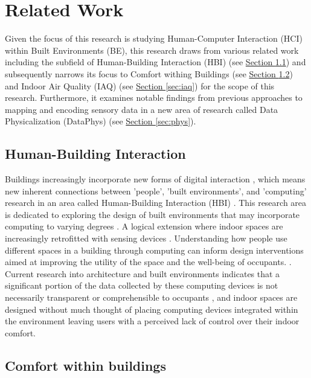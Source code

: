 \section{Related Work}
\label{sec:related_work}
Given the focus of this research is studying Human-Computer Interaction (HCI) within Built Environments (BE), this research draws from various related work including the subfield of Human-Building Interaction (HBI) (see \hyperref[sec:hbi]{Section \ref*{sec:hbi}}) and subsequently narrows its focus to Comfort withing Buildings (see \hyperref[sec:poe]{Section \ref*{sec:poe}}) and Indoor Air Quality (IAQ) (see \hyperref[sec:iaq]{Section \ref*{sec:iaq}}) for the scope of this research. Furthermore, it examines notable findings from previous approaches to mapping and encoding sensory data in a new area of research called Data Physicalization (DataPhys) (see \hyperref[sec:phys]{Section \ref*{sec:phys}}).

\subsection{Human-Building Interaction}
\label{sec:hbi}

Buildings increasingly incorporate new forms of digital interaction \cite{pulsipher_towards_2023, margariti_understanding_2023}, which means new inherent connections between 'people', 'built environments', and 'computing' research in an area called Human-Building Interaction (HBI) \cite{alavi_introduction_2019, taherkhani_human-building_2023}. This research area is dedicated to exploring the design of built environments that may incorporate computing to varying degrees \cite{sowles_introducing_2021}.  A logical extension where indoor spaces are increasingly retrofitted with sensing devices \cite{pulsipher_towards_2023}. Understanding how people use different spaces in a building through computing can inform design interventions aimed at improving the utility of the space and the well-being of occupants. \cite{verma_studying_2017}. Current research into architecture and built environments indicates that a significant portion of the data collected by these computing devices is not necessarily transparent or comprehensible to occupants \cite{schnadelbach_adaptive_2019}, and indoor spaces are designed without much thought of placing computing devices integrated within the environment \cite{johansen_temporal_2019, kirsh_architects_2019} leaving users with a perceived lack of control over their indoor comfort. 

\subsection{Comfort within buildings}
\label{sec:poe}


